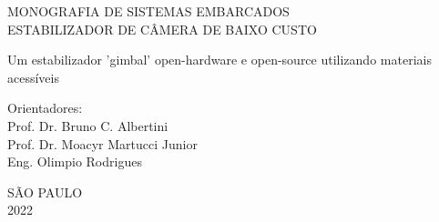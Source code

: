 \begin{titlepage}
\vfill
\begin{center}
    \vspace{2cm}
    {\Large \textsc{MONOGRAFIA DE SISTEMAS EMBARCADOS\\
    ESTABILIZADOR DE CÂMERA DE BAIXO CUSTO}\\}
    \vspace{1cm}
    \hspace{.45\linewidth}
    \begin{minipage}{.50\linewidth}

            Um estabilizador 'gimbal' open-hardware e open-source utilizando materiais acessíveis

            \vspace{0.5 cm}

            Orientadores: \\
            Prof. Dr. Bruno C. Albertini\\
            Prof. Dr. Moacyr Martucci Junior\\
            Eng. Olimpio Rodrigues
    
    \end{minipage}

    \vspace{2cm}
    \vfill
    {\large SÃO PAULO\\ 2022}
\end{center}

\end{titlepage}